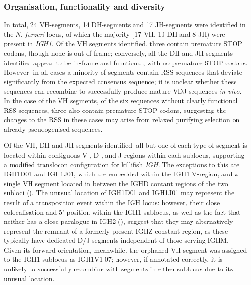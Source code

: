 	\subsubsection{Organisation, functionality and diversity}
	\label{sec:nfu-locus-variable-orga}
	 
	In total, 24 VH-segments, 14 DH-segments and 17 JH-segments were identified in the \textit{N. furzeri} locus, of which the majority (17 VH, 10 DH and 8 JH) were present in \textit{IGH1}. Of the VH segments identified, three contain premature STOP codons, though none is out-of-frame; conversely, all the DH and JH segments identified appear to be in-frame and functional, with no premature STOP codons. However, in all cases a minority of segments contain RSS sequences that deviate significantly from the expected consensus sequence; it is unclear whether these sequences can recombine to successfully produce mature VDJ sequences \textit{in vivo}. In the case of the VH segments, of the six sequences without clearly functional RSS sequences, three also contain premature STOP codons, suggesting the changes to the RSS in these cases may arise from relaxed purifying selection on already-pseudogenised sequences.
	
	Of the VH, DH and JH segments identified, all but one of each type of segment is located within contiguous V-, D-, and J-regions within each sublocus, supporting a modified translocon configuration for killifish \textit{IGH}. The exceptions to this are IGH1D01 and IGH1J01, which are embedded within the IGH1 V-region, and a single VH segment located in between the IGHD contant regions of the two subloci (). The unusual location of IGH1D01 and IGH1J01 may represent the result of a transposition event within the IGH locus; however, their close colocalisation and 5' position within the IGH1 sublocus, as well as the fact that neither has a close paralogue in IGH2 (), suggest that they may alternatively represent the remnant of a formerly present IGHZ constant region, as these typically have dedicated D/J segments independent of those serving IGHM. Given its forward orientation, meanwhile, the orphaned VH-segment was assigned to the IGH1 sublocus as IGH1V1-07; however, if annotated correctly, it is unlikely to successfully recombine with segments in either sublocus due to its unusual location. %
		

